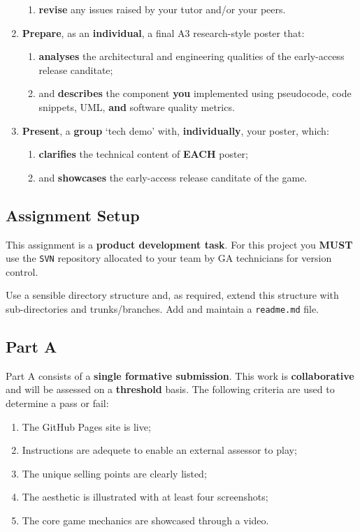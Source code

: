 \documentclass{../../fal_assignment}
\begin{document}
\begin{enumerate}[label=(\Alph*)]
\begin{enumerate}[label=\roman*.]
    		\item \textbf{revise} any issues raised by your tutor and/or your peers.
	\end{enumerate}
    \item \textbf{Prepare}, as an \textbf{individual}, a final A3 research-style poster that:
    	\begin{enumerate}[label=\roman*.]
    		\item \textbf{analyses} the architectural and engineering qualities of the early-access release canditate;
    		\item and \textbf{describes} the component \textbf{you} implemented using pseudocode, code snippets, UML, \textbf{and} software quality metrics. 
	\end{enumerate}
    \item \textbf{Present}, a \textbf{group} `tech demo' with, \textbf{individually}, your poster, which:
    	\begin{enumerate}[label=\roman*.]
    		\item \textbf{clarifies} the technical content of \textbf{EACH} poster;
    		\item and \textbf{showcases} the early-access release canditate of the game.
	\end{enumerate}
\end{enumerate}
  
\subsection*{Assignment Setup}

This assignment is a \textbf{product development task}. For this project you \textbf{MUST} use the \texttt{SVN} repository allocated to your team by GA technicians for version control.

Use a sensible directory structure and, as required, extend this structure with sub-directories and trunks/branches. Add and maintain a \texttt{readme.md} file. 

\subsection*{Part A}

Part A consists of a \textbf{single formative submission}. This work is \textbf{collaborative} and will be assessed on a \textbf{threshold} basis. The following criteria are used to determine a pass or fail:

\begin{enumerate}[label=(\alph*)]
	\item The GitHub Pages site is live;
	\item Instructions are adequete to enable an external assessor to play;
	\item The unique selling points are clearly listed;
	\item The aesthetic is illustrated with at least four screenshots;
	\item The core game mechanics are showcased through a video.
\end{enumerate}
\end{document}
